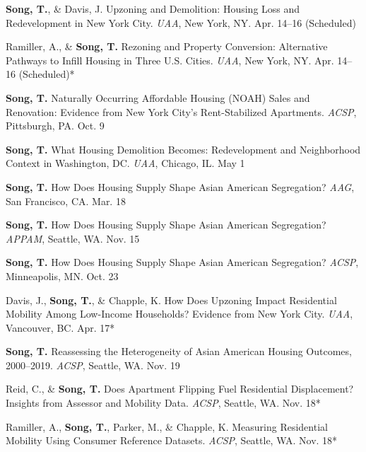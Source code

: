 \documentclass[11pt,letterpaper]{article}
\begin{document}
\begin{tablist}
    \item[2027] \tab{}\textbf{Song, T.}, \& Davis, J. Upzoning and Demolition: Housing Loss and Redevelopment in New York City.
    \emph{UAA}, New York, NY. Apr. 14--16 (Scheduled)

    \item[2027] \tab{}Ramiller, A., \& \textbf{Song, T.} Rezoning and Property Conversion: Alternative Pathways to Infill Housing in Three U.S. Cities.
    \emph{UAA}, New York, NY. Apr. 14--16 (Scheduled)*

    \item[2026] \tab{}\textbf{Song, T.} Naturally Occurring Affordable Housing (NOAH) Sales and Renovation: Evidence from New York City's Rent-Stabilized Apartments.
    \emph{ACSP}, Pittsburgh, PA. Oct. 9

    \item[2026] \tab{}\textbf{Song, T.} What Housing Demolition Becomes: Redevelopment and Neighborhood Context in Washington, DC.
    \emph{UAA}, Chicago, IL. May 1

\item[2026] \tab{}\textbf{Song, T.} How Does Housing Supply Shape Asian American Segregation?
    \emph{AAG}, San Francisco, CA. Mar. 18
  
  \item[2025] \tab{}\textbf{Song, T.} How Does Housing Supply Shape Asian American Segregation?
    \emph{APPAM}, Seattle, WA. Nov. 15

  \item[2025] \tab{}\textbf{Song, T.} How Does Housing Supply Shape Asian American Segregation?
    \emph{ACSP}, Minneapolis, MN. Oct. 23

  \item[2025] \tab{}Davis, J., \textbf{Song, T.}, \& Chapple, K. How Does Upzoning Impact Residential Mobility Among Low-Income Households? Evidence from New York City.
    \emph{UAA}, Vancouver, BC. Apr. 17*

  \item[2024] \tab{}\textbf{Song, T.} Reassessing the Heterogeneity of Asian American Housing Outcomes, 2000--2019.
    \emph{ACSP}, Seattle, WA. Nov. 19

  \item[2024] \tab{}Reid, C., \& \textbf{Song, T.} Does Apartment Flipping Fuel Residential Displacement? Insights from Assessor and Mobility Data.
    \emph{ACSP}, Seattle, WA. Nov. 18*

  \item[2024] \tab{}Ramiller, A., \textbf{Song, T.}, Parker, M., \& Chapple, K. Measuring Residential Mobility Using Consumer Reference Datasets.
    \emph{ACSP}, Seattle, WA. Nov. 18*


\end{tablist}
\end{document}
